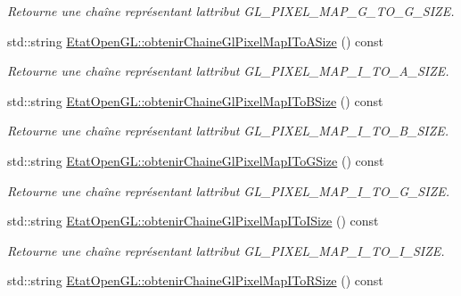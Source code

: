 \begin{DoxyCompactItemize}
\begin{DoxyCompactList}\small\item\em Retourne une chaîne représentant l\textquotesingle{}attribut G\+L\+\_\+\+P\+I\+X\+E\+L\+\_\+\+M\+A\+P\+\_\+\+G\+\_\+\+T\+O\+\_\+\+G\+\_\+\+S\+I\+Z\+E. \end{DoxyCompactList}\item 
std\+::string \hyperlink{group__utilitaire_gadadb89e110f09aaf815829f028ab539d}{Etat\+Open\+G\+L\+::obtenir\+Chaine\+Gl\+Pixel\+Map\+I\+To\+A\+Size} () const 
\begin{DoxyCompactList}\small\item\em Retourne une chaîne représentant l\textquotesingle{}attribut G\+L\+\_\+\+P\+I\+X\+E\+L\+\_\+\+M\+A\+P\+\_\+\+I\+\_\+\+T\+O\+\_\+\+A\+\_\+\+S\+I\+Z\+E. \end{DoxyCompactList}\item 
std\+::string \hyperlink{group__utilitaire_ga8fac55d9d77a0b119c7247536471b5fe}{Etat\+Open\+G\+L\+::obtenir\+Chaine\+Gl\+Pixel\+Map\+I\+To\+B\+Size} () const 
\begin{DoxyCompactList}\small\item\em Retourne une chaîne représentant l\textquotesingle{}attribut G\+L\+\_\+\+P\+I\+X\+E\+L\+\_\+\+M\+A\+P\+\_\+\+I\+\_\+\+T\+O\+\_\+\+B\+\_\+\+S\+I\+Z\+E. \end{DoxyCompactList}\item 
std\+::string \hyperlink{group__utilitaire_gaa449af86fad19dad37eea16a918b3c33}{Etat\+Open\+G\+L\+::obtenir\+Chaine\+Gl\+Pixel\+Map\+I\+To\+G\+Size} () const 
\begin{DoxyCompactList}\small\item\em Retourne une chaîne représentant l\textquotesingle{}attribut G\+L\+\_\+\+P\+I\+X\+E\+L\+\_\+\+M\+A\+P\+\_\+\+I\+\_\+\+T\+O\+\_\+\+G\+\_\+\+S\+I\+Z\+E. \end{DoxyCompactList}\item 
std\+::string \hyperlink{group__utilitaire_ga0eb7b39aef0ca240d98e9507703cd1e4}{Etat\+Open\+G\+L\+::obtenir\+Chaine\+Gl\+Pixel\+Map\+I\+To\+I\+Size} () const 
\begin{DoxyCompactList}\small\item\em Retourne une chaîne représentant l\textquotesingle{}attribut G\+L\+\_\+\+P\+I\+X\+E\+L\+\_\+\+M\+A\+P\+\_\+\+I\+\_\+\+T\+O\+\_\+\+I\+\_\+\+S\+I\+Z\+E. \end{DoxyCompactList}\item 
std\+::string \hyperlink{group__utilitaire_gad3cc6e9acee4df62ca1407e6b42d87d4}{Etat\+Open\+G\+L\+::obtenir\+Chaine\+Gl\+Pixel\+Map\+I\+To\+R\+Size} () const 

\end{DoxyCompactItemize}
